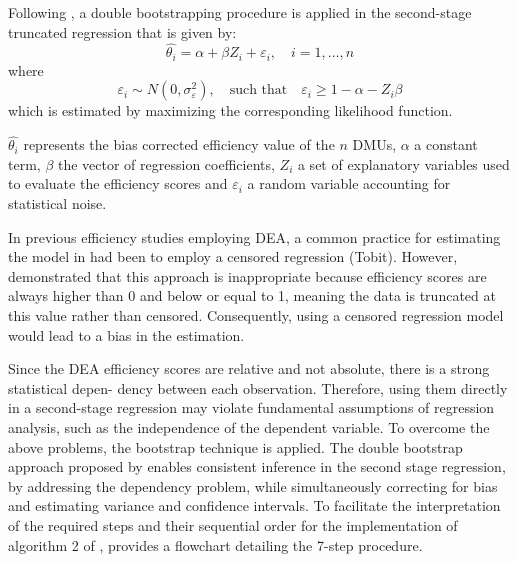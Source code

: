 Following \cite{simar2007}, a double bootstrapping procedure is applied in the second-stage
truncated regression that is given by:
\begin{equation}
\label{eq:regression}
\hat{\theta_i}=\alpha+\beta Z_i + \varepsilon_i, \quad i=1,\ldots,n   
\end{equation}
where
\begin{equation}
\label{eq:noise}
\varepsilon_i \sim N(0, \sigma_\varepsilon^2), \quad \text{such that} \quad \varepsilon_i \geq 1 - \alpha - Z_i \beta
\end{equation}
which is estimated by maximizing the corresponding likelihood function.

$\hat{\theta_i}$ represents the bias corrected efficiency value of the $n$ DMUs, $\alpha$ a constant term, $\beta$ the vector of
regression coefficients, $Z_i$ a set of explanatory variables used to evaluate the efficiency scores and $\varepsilon_i$ a
random variable accounting for statistical noise. 

In previous efficiency studies employing DEA, a common practice for estimating the model in  had been to employ a censored regression (Tobit). However, \cite{simar2007} demonstrated that this approach is inappropriate because efficiency scores are always higher than 0 and below or equal to 1, meaning the data is truncated at this value rather than censored. Consequently, using a censored regression model would lead to a bias in the estimation.

Since the DEA efficiency scores are relative and not absolute, there is a strong statistical depen-
dency between each observation. Therefore, using them directly in a second-stage regression may
violate fundamental assumptions of regression analysis, such as the independence of the dependent
variable. To overcome the above problems, the bootstrap technique is applied. The double bootstrap approach proposed
by \cite{simar2007} enables consistent inference in the second stage regression, by addressing
the dependency problem, while simultaneously correcting for bias and estimating variance and confidence intervals. 
To facilitate the interpretation of the required steps and their sequential order for the implementation
of algorithm 2 of \cite{simar2007},  provides a flowchart detailing the 7-step procedure.

